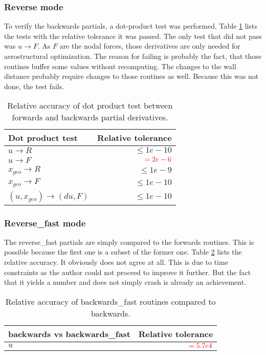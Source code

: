 \subsubsection{Reverse mode}
To verify the backwards partials, a dot-product test was performed. Table
\ref{tab:partials_dotproduct_test} lists the tests  with the relative tolerance
it was passed. The only test that did not pass was $u \rightarrow F$. As $F$
are the nodal forces, those derivatives are only needed for aerostructural
optimization. The reason for failing is probably the fact, that those routines
buffer some values without recomputing. The changes to the wall distance
probably require changes to those routines as well. Because this was not done,
the test fails.

\begin{table}[H]
    \centering
    \begin{tabular}{l r}
        \toprule
        Dot product test                     & Relative tolerance \\
        \hline
        $u \rightarrow R$                   & $\leq 1e-10$ \\
        $u \rightarrow F$                   & $\textcolor{red}{= 2e-6}$ \\
        $x_{geo} \rightarrow R$             & $\leq 1e-9$ \\
        $x_{geo} \rightarrow F$             & $\leq 1e-10$ \\
        $(u, x_{geo}) \rightarrow (du, F)$  & $\leq 1e-10$ \\
        \bottomrule
    \end{tabular}
    \caption{Relative accuracy of dot product test between forwards and
    backwards partial derivatives.}
    \label{tab:partials_dotproduct_test}
\end{table}


\subsubsection{Reverse\_fast mode}
The reverse\_fast partials are simply compared to the forwards routines. This
is possible because the first one is a subset of the former one. Table
\ref{tab:partials_fast} lists the relative accuracy. It obviously does not
agree at all. This is due to time constraints as the author could not proceed
to improve it further. But the fact that it yields a number and does not simply
crash is already an achievement.

\begin{table}[H]
    \centering
    \begin{tabular}{l r}
        \toprule
        backwards vs backwards\_fast        & Relative tolerance \\
        \hline
        $u$                                 & $\textcolor{red}{= 5.7e4}$ \\
        \bottomrule
    \end{tabular}
    \caption{Relative accuracy of backwards\_fast routines compared to
    backwards.}
    \label{tab:partials_fast}
\end{table}







